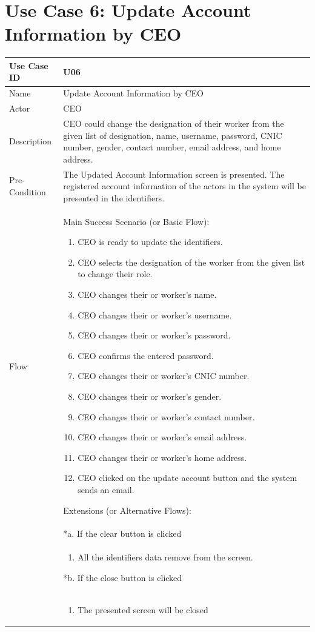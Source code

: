 \documentclass[12pt,a4paper]{report}
\begin{document}
\section{Use Case 6: Update Account Information by CEO}
\begin{tabular}{ | m{3cm} | m{12cm}| } \hline
Use Case ID & U06   \\\hline
Name  &  Update Account Information by CEO \\ \hline
Actor &   CEO\\ \hline
Description & CEO could change the designation of their worker from the given list of designation, name, username, password, CNIC number, gender, contact number, email address, and home address.\\ \hline
Pre-Condition & The Updated Account Information screen is presented. The registered account information of the actors in the system will be presented in the identifiers.  \\\hline
Flow & Main Success Scenario (or Basic Flow):
\begin{enumerate}
\item CEO is ready to update the identifiers.   
\item CEO selects the designation of the worker from the given list to change their role. 
\item  CEO changes their or worker's name.
\item  CEO changes their or worker's username.
\item  CEO changes their or worker's password.
\item  CEO confirms the entered password.
\item  CEO changes their or worker's CNIC number.
\item CEO changes their or worker's gender. 
\item CEO changes their or worker's contact number. 
\item CEO changes their or worker's email address.
\item CEO changes their or worker's home address. 
\item CEO clicked on the update account button and the system sends an email.
\end{enumerate}
Extensions (or Alternative Flows):\\
& *a. If the clear button is clicked \\
& \begin{enumerate}
		\item All the identifiers data remove from the screen.
	\end{enumerate}
*b. If the close button is clicked\\
&	\begin{enumerate}
		\item The presented screen will be closed
	\end{enumerate}
\\\hline
\end{tabular}
\end{document}
